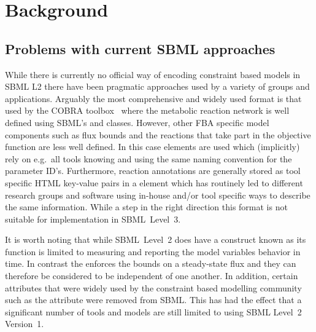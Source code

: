 
\section{Background}
\label{background}

\subsection{Problems with current SBML approaches}

While there is currently no official way of encoding constraint based models
in SBML L2 there have been pragmatic approaches used by a variety of groups
and applications. Arguably the most comprehensive and widely used format is
that used by the \textsf{COBRA toolbox}~\citep{cobra} where the metabolic
reaction network is well defined using SBML's \Reaction and \Species
classes. However, other FBA specific model components such as flux bounds
and the reactions that take part in the objective function are less well
defined. In this case \LocalParameter elements are used which (implicitly)
rely on e.g.~all tools knowing and using the same naming convention for the
parameter ID's. Furthermore, reaction annotations are generally stored as
tool specific HTML key-value pairs in a \Notes element which has routinely
led to different research groups and software using in-house and/or tool
specific ways to describe the same information. 
%
%
While a step in the right direction this format is not suitable for implementation in SBML~Level~3.

It is worth noting that while SBML~Level~2 does have a construct known as
\Constraint its function is limited to measuring and reporting the model
variables behavior in time. In contrast the \FluxBound enforces the bounds
on a steady-state flux and they can therefore be considered to be
independent of one another.
%
In addition, certain attributes that were widely used by the constraint based
modelling community such as the \Species attribute  were
removed from SBML. This has had the effect that a significant number of
tools and models are still limited to using SBML Level~2 Version~1.\cite{oberhardt_2009}

